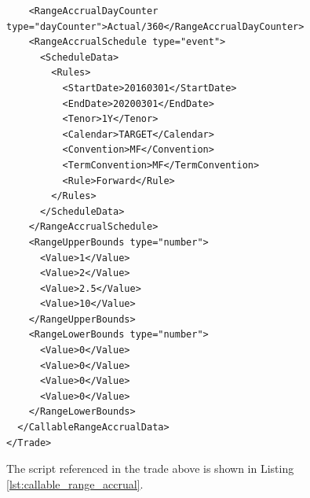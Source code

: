 \begin{verbatim}
    <RangeAccrualDayCounter type="dayCounter">Actual/360</RangeAccrualDayCounter>
    <RangeAccrualSchedule type="event">
      <ScheduleData>
        <Rules>
          <StartDate>20160301</StartDate>
          <EndDate>20200301</EndDate>
          <Tenor>1Y</Tenor>
          <Calendar>TARGET</Calendar>
          <Convention>MF</Convention>
          <TermConvention>MF</TermConvention>
          <Rule>Forward</Rule>
        </Rules>
      </ScheduleData>
    </RangeAccrualSchedule>
    <RangeUpperBounds type="number">
      <Value>1</Value>
      <Value>2</Value>
      <Value>2.5</Value>
      <Value>10</Value>
    </RangeUpperBounds>
    <RangeLowerBounds type="number">
      <Value>0</Value>
      <Value>0</Value>
      <Value>0</Value>
      <Value>0</Value>
    </RangeLowerBounds>
  </CallableRangeAccrualData>
</Trade>
\end{verbatim}

The script referenced in the trade above is shown in Listing \ref{lst:callable_range_accrual}.

